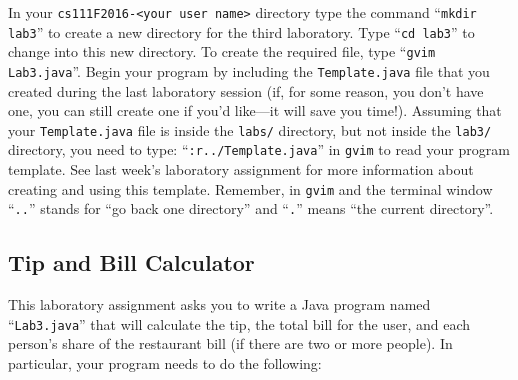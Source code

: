 In your {\tt cs111F2016-<your user name>} directory type the command ``{\tt mkdir lab3}'' to create a new directory for
the third laboratory.  \noindent Type ``{\tt cd lab3}'' to change into this new directory.  To create the required file,
type ``{\tt gvim Lab3.java}''. Begin your program by including the {\tt Template.java} file that you created during the
last laboratory session (if, for some reason, you don't have one, you can still create one if you'd like---it will
save you time!).  Assuming that your {\tt Template.java} file is inside the {\tt labs/} directory, but not
inside the {\tt lab3/} directory, you need to type: ``{\tt :r../Template.java}'' in {\tt gvim} to read your program
template.  See last week's laboratory assignment for more information about creating and using this template. Remember,
in {\tt gvim} and the terminal window ``{\tt ..}'' stands for ``go back one directory'' and ``{\tt .}'' means ``the
current directory''.

\vspace{-0.15in}
\subsection*{Tip and Bill Calculator}

This laboratory assignment asks you to write a Java program named ``{\tt Lab3.java}'' that will calculate the tip, the
total bill for the user, and each person's share of the restaurant bill (if there are two or more people). In
particular, your program needs to do the following:

